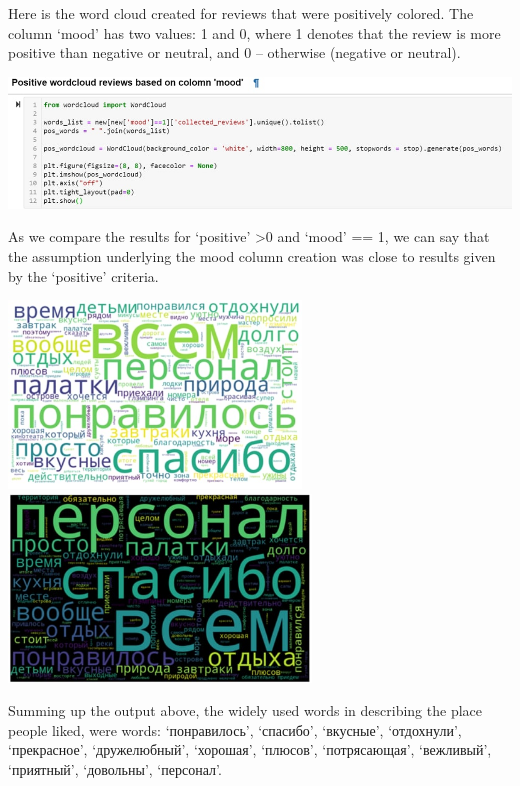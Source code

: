 \documentclass{article}
\begin{document}
Here is the word cloud created for reviews that were positively colored. The column ‘mood’ has two values: 1 and 0, where 1 denotes that the review is more positive than negative or neutral, and 0 – otherwise (negative or neutral).

\begin{center}
\includegraphics[width=1\linewidth]{images/figure 11.jpg}
\end{center}

As we compare the results for ‘positive’ \textgreater 0 and ‘mood’ == 1, we can say that the assumption underlying the mood column creation was close to results given by the ‘positive’ criteria. 

\begin{center}
\includegraphics[width=0.4\linewidth,height=5cm]{images/figure 12.jpg}\quad\includegraphics[width=0.4\linewidth,height=5cm]{images/figure 13.jpg}
\end{center}

Summing up the output above, the widely used words in describing the place people liked, were words:  ‘понравилось’, ‘спасибо’, ‘вкусные’, ‘отдохнули’, ‘прекрасное’, ‘дружелюбный’, ‘хорошая’, ‘плюсов’, ‘потрясающая’, ‘вежливый’, ‘приятный’, ‘довольны’, ‘персонал’.  
\end{document}
